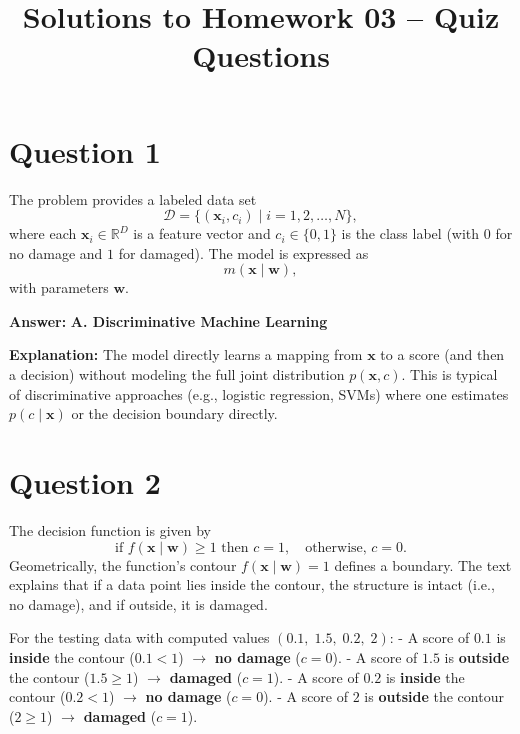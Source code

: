 \documentclass[12pt]{article}
\begin{document}
\doublespacing

\title{Solutions to Homework 03 -- Quiz Questions}
\author{}
\date{}
\maketitle

\section*{Question 1}

The problem provides a labeled data set
\[
\mathcal{D} = \{(\bm{x}_i, c_i) \mid i = 1, 2, \ldots, N\},
\]
where each \(\bm{x}_i \in \mathbb{R}^D\) is a feature vector and \(c_i \in \{0,1\}\) is the class label (with \(0\) for no damage and \(1\) for damaged). The model is expressed as
\[
m(\bm{x}\mid \bm{w}),
\]
with parameters \(\bm{w}\).

\textbf{Answer:} \textbf{A. Discriminative Machine Learning}

\textbf{Explanation:} The model directly learns a mapping from \(\bm{x}\) to a score (and then a decision) without modeling the full joint distribution \(p(\bm{x}, c)\). This is typical of discriminative approaches (e.g., logistic regression, SVMs) where one estimates \(p(c \mid \bm{x})\) or the decision boundary directly.

\bigskip

\section*{Question 2}

The decision function is given by
\[
\text{if } f(\bm{x}\mid \bm{w}) \geq 1 \text{ then } c = 1,\quad \text{otherwise, } c = 0.
\]
Geometrically, the function’s contour \(f(\bm{x}\mid \bm{w}) = 1\) defines a boundary. The text explains that if a data point lies inside the contour, the structure is intact (i.e., no damage), and if outside, it is damaged.

For the testing data with computed values \((0.1,\; 1.5,\; 0.2,\; 2)\):
- A score of \(0.1\) is \textbf{inside} the contour (\(0.1 < 1\)) \(\rightarrow\) \textbf{no damage} (\(c=0\)).
- A score of \(1.5\) is \textbf{outside} the contour (\(1.5 \ge 1\)) \(\rightarrow\) \textbf{damaged} (\(c=1\)).
- A score of \(0.2\) is \textbf{inside} the contour (\(0.2 < 1\)) \(\rightarrow\) \textbf{no damage} (\(c=0\)).
- A score of \(2\) is \textbf{outside} the contour (\(2 \ge 1\)) \(\rightarrow\) \textbf{damaged} (\(c=1\)).
\end{document}

